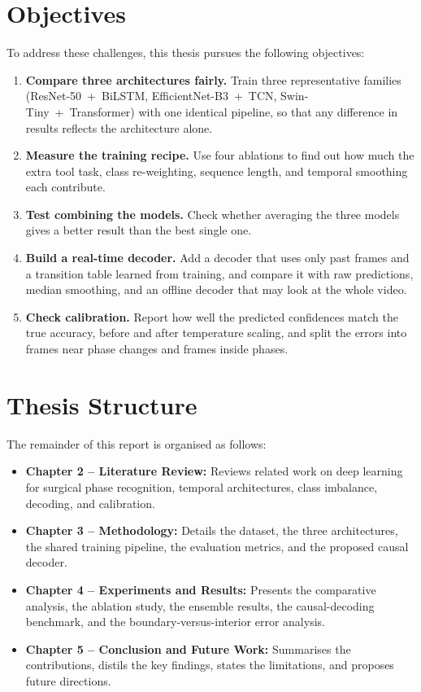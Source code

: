 \documentclass[11pt,a4paper]{report}
\begin{document}
\section{Objectives}

To address these challenges, this thesis pursues the following objectives:
\begin{enumerate}
    \item \textbf{Compare three architectures fairly.} Train three representative families (ResNet-50~+~BiLSTM, EfficientNet-B3~+~TCN, Swin-Tiny~+~Transformer) with one identical pipeline, so that any difference in results reflects the architecture alone.
    \item \textbf{Measure the training recipe.} Use four ablations to find out how much the extra tool task, class re-weighting, sequence length, and temporal smoothing each contribute.
    \item \textbf{Test combining the models.} Check whether averaging the three models gives a better result than the best single one.
    \item \textbf{Build a real-time decoder.} Add a decoder that uses only past frames and a transition table learned from training, and compare it with raw predictions, median smoothing, and an offline decoder that may look at the whole video.
    \item \textbf{Check calibration.} Report how well the predicted confidences match the true accuracy, before and after temperature scaling, and split the errors into frames near phase changes and frames inside phases.
\end{enumerate}

\section{Thesis Structure}

The remainder of this report is organised as follows:
\begin{itemize}
    \item \textbf{Chapter 2 -- Literature Review:} Reviews related work on deep learning for surgical phase recognition, temporal architectures, class imbalance, decoding, and calibration.
    \item \textbf{Chapter 3 -- Methodology:} Details the dataset, the three architectures, the shared training pipeline, the evaluation metrics, and the proposed causal decoder.
    \item \textbf{Chapter 4 -- Experiments and Results:} Presents the comparative analysis, the ablation study, the ensemble results, the causal-decoding benchmark, and the boundary-versus-interior error analysis.
    \item \textbf{Chapter 5 -- Conclusion and Future Work:} Summarises the contributions, distils the key findings, states the limitations, and proposes future directions.
\end{itemize}
\end{document}
